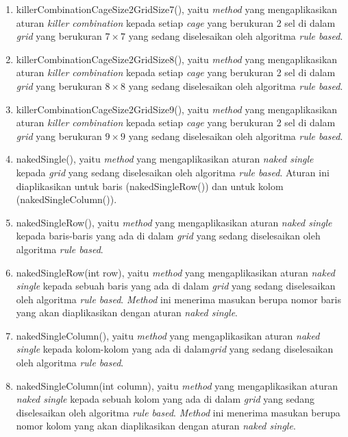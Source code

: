 \begin{enumerate}
\item killerCombinationCageSize2GridSize7(), yaitu \textit{method} yang mengaplikasikan aturan \textit{killer combination} kepada setiap \textit{cage} yang berukuran 2 sel di dalam \textit{grid} yang berukuran \begin{math}7 \times 7\end{math} yang sedang diselesaikan oleh algoritma \textit{rule based}.
\item killerCombinationCageSize2GridSize8(), yaitu \textit{method} yang mengaplikasikan aturan \textit{killer combination} kepada setiap \textit{cage} yang berukuran 2 sel di dalam \textit{grid} yang berukuran \begin{math}8 \times 8\end{math} yang sedang diselesaikan oleh algoritma \textit{rule based}.
\item killerCombinationCageSize2GridSize9(), yaitu \textit{method} yang mengaplikasikan aturan \textit{killer combination} kepada setiap \textit{cage} yang berukuran 2 sel di dalam \textit{grid} yang berukuran \begin{math}9 \times 9\end{math} yang sedang diselesaikan oleh algoritma \textit{rule based}.
\item nakedSingle(), yaitu \textit{method} yang mengaplikasikan aturan \textit{naked single} kepada \textit{grid} yang sedang diselesaikan oleh algoritma \textit{rule based}. Aturan ini diaplikasikan untuk baris (nakedSingleRow()) dan untuk kolom (nakedSingleColumn()).
\item nakedSingleRow(), yaitu \textit{method} yang mengaplikasikan aturan \textit{naked single} kepada baris-baris yang ada di dalam \textit{grid} yang sedang diselesaikan oleh algoritma \textit{rule based}.
\item nakedSingleRow(int row), yaitu \textit{method} yang mengaplikasikan aturan \textit{naked single} kepada sebuah baris yang ada di dalam \textit{grid} yang sedang diselesaikan oleh algoritma \textit{rule based}. \textit{Method} ini menerima masukan berupa nomor baris yang akan diaplikasikan dengan aturan \textit{naked single}.
\item nakedSingleColumn(), yaitu \textit{method} yang mengaplikasikan aturan \textit{naked single} kepada kolom-kolom yang ada di dalam\textit{grid} yang sedang diselesaikan oleh algoritma \textit{rule based}.
\item nakedSingleColumn(int column), yaitu \textit{method} yang mengaplikasikan aturan \textit{naked single} kepada sebuah kolom yang ada di dalam \textit{grid} yang sedang diselesaikan oleh algoritma \textit{rule based}. \textit{Method} ini menerima masukan berupa nomor kolom yang akan diaplikasikan dengan aturan \textit{naked single}.

\end{enumerate}

